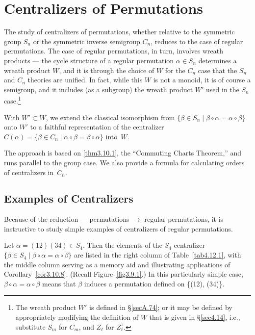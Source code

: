 \documentclass{surv-l}
\numberwithin{equation}{section}
\numberwithin{table}{section}
\numberwithin{figure}{section}
\theoremstyle{plain}
\theoremstyle{definition}
\begin{document}
\chapter{Centralizers of Permutations}\label{chap4}

The study of centralizers of permutations, whether relative to the
symmetric group $S_{n}$ or the symmetric inverse semigroup
$C_{n}$, reduces to the case of regular permutations. The case of
regular permutations, in turn, involves wreath products --- the
cycle structure of a regular permutation $\alpha\in S_{n}$
determines a wreath product $W$, and it is
through the choice of $W$ for the $C_{n}$ case that the $S_{n}$
and $C_{n}$ theories are unified. In fact, while this $W$ is not a
monoid, it is of course a semigroup, and it includes (as a
subgroup) the wreath product $W'$ used in the $S_{n}$
case.\footnote{The wreath product $W'$ is defined in
\S\ref{secA.74}; or it may be defined by appropriately modifying
the definition of $W$ that is given in \S\ref{sec4.14}, i.e.,
substitute $S_{m}$ for $C_{m}$, and $Z_{\ell}$ for
$Z_{\ell}^{z}$.}

With $W'\subset W$, we extend the classical isomorphism from
$\{\beta\in S_{n}\mid \beta \circ\alpha= \alpha \circ\beta\}$
onto $W'$ to a faithful representation of the centralizer
$C(\alpha)=\{\beta\in C_{n}\mid \alpha \circ\beta=\beta
\circ\alpha\}$ into~$W$.

The approach is based on \ref{thm3.10.1}, the ``Commuting Charts
Theorem,'' and runs parallel to the group case. We also provide a
formula for calculating orders of
centralizers in~$C_{n}$.

\setcounter{section}{11}
\section{Examples of Centralizers}\label{sec4.12}

Because of the reduction --- permutations $\rightarrow$ regular
permutations, it is instructive to study simple examples of
centralizers of regular permutations.

Let $\alpha=(12)(34)\in S_{4}$. Then the elements of the $S_{4}$
centralizer $\{\beta\in S_{4}\mid \beta \circ\alpha=\alpha
\circ\beta\}$ are listed in the right column of
Table~\ref{tab4.12.1}, with the middle column serving as a memory
aid and illustrating applications of Corollary~\ref{cor3.10.8}.
(Recall Figure~\ref{fig3.9.1}.) In this particularly simple case,
$\beta \circ\alpha=\alpha \circ\beta$ means that $\beta$ induces a
permutation defined on \{(12), (34)\}.
\end{document}
